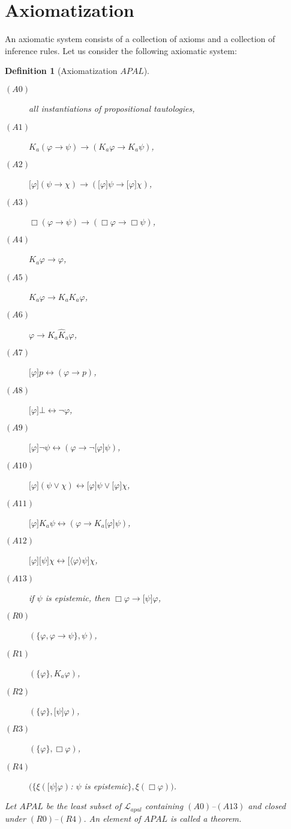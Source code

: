 \documentclass{article}[12pt]
\newtheorem{definition}{Definition}
\renewcommand{\phi}{\varphi}
\begin{document}
\section{Axiomatization}
An axiomatic system consists of a collection of axioms and a collection of inference rules.
Let us consider the following axiomatic system:
\begin{definition}[Axiomatization $APAL$]
\begin{description}
\item[$(A0)$] all instantiations of propositional tautologies,
\item[$(A1)$] $K_{a}(\phi\rightarrow\psi)\rightarrow(K_{a}\phi\rightarrow K_{a}\psi)$,
\item[$(A2)$] $\lbrack\phi\rbrack(\psi\rightarrow\chi)\rightarrow(\lbrack\phi\rbrack\psi\rightarrow\lbrack\phi\rbrack\chi)$,
\item[$(A3)$] $\Box(\phi\rightarrow\psi)\rightarrow(\Box\phi\rightarrow\Box\psi)$,
\item[$(A4)$] $K_{a}\phi\rightarrow\phi$,
\item[$(A5)$] $K_{a}\phi\rightarrow K_{a}K_{a}\phi$,
\item[$(A6)$] $\phi\rightarrow K_{a}\hat{K}_{a}\phi$,
\item[$(A7)$] $\lbrack\phi\rbrack p\leftrightarrow(\phi\rightarrow p)$,
\item[$(A8)$] $\lbrack\phi\rbrack\bot\leftrightarrow\neg\phi$,
\item[$(A9)$] $\lbrack\phi\rbrack\neg\psi\leftrightarrow(\phi\rightarrow\neg\lbrack\phi\rbrack\psi)$,
\item[$(A10)$] $\lbrack\phi\rbrack(\psi\vee\chi)\leftrightarrow\lbrack\phi\rbrack\psi\vee\lbrack\phi\rbrack\chi$,
\item[$(A11)$] $\lbrack\phi\rbrack K_{a}\psi\leftrightarrow(\phi\rightarrow K_{a}\lbrack\phi\rbrack\psi)$,
\item[$(A12)$] $\lbrack\phi\rbrack\lbrack\psi\rbrack\chi\leftrightarrow\lbrack\langle\phi\rangle\psi\rbrack\chi$,
\item[$(A13)$] if $\psi$ is epistemic, then $\Box\phi\rightarrow\lbrack\psi\rbrack\phi$,
\item[$(R0)$] $(\{\phi,\phi\rightarrow\psi\},\psi)$,
\item[$(R1)$] $(\{\phi\},K_{a}\phi)$,
\item[$(R2)$] $(\{\phi\},\lbrack\psi\rbrack\phi)$,
\item[$(R3)$] $(\{\phi\},\Box\phi)$, \item[$(R4)$] $(\{\xi(\lbrack\psi\rbrack\phi)$: $\psi$ is epistemic$\},\xi(\Box\phi))$.
\end{description}


\bigskip

\noindent
Let $APAL$ be the least subset of $\mathcal{L}_{apal}$ containing $(A0)$--$(A13)$ and closed under $(R0)$--$(R4)$. An element of $APAL$ is called a {\em theorem}.
\end{definition}
\end{document}

